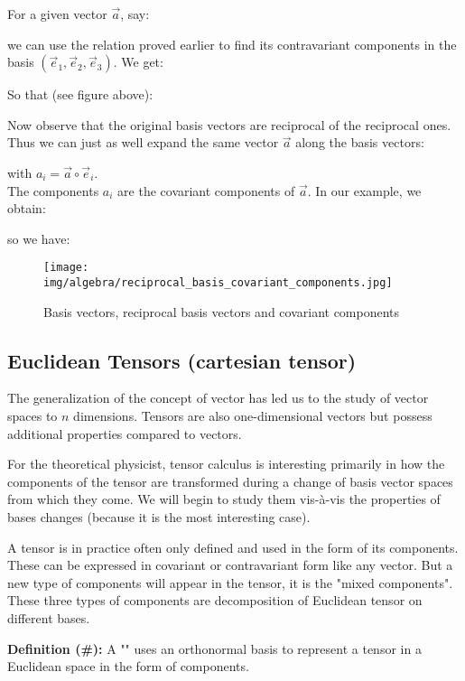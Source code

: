 	\begin{tcolorbox}[colframe=black,colback=white,sharp corners]
	For a given vector $\vec{a}$, say:
	
	we can use the relation proved earlier to find its contravariant components in the basis $(\vec{e}_1,\vec{e}_2,\vec{e}_3)$. We get:
	
	So that (see figure above):
	
	Now observe that the original basis vectors are reciprocal of the reciprocal ones. Thus we can just as well expand the same vector $\vec{a}$ along the basis vectors:
	
	with $a_i=\vec{a}\circ\vec{e}_i$.\\

	The components $a_i$ are the covariant components of $\vec{a}$. In our example, we obtain:
	
	so we have:
	
	\begin{figure}[H]
		\centering
		\texttt{[image: img/algebra/reciprocal\_basis\_covariant\_components.jpg]}
		\caption[]{Basis vectors, reciprocal basis vectors and covariant components}
	\end{figure}
	\end{tcolorbox}
	
	\subsection{Euclidean Tensors (cartesian tensor)}
	The generalization of the concept of vector has led us to the study of vector spaces to $n$ dimensions. Tensors are also one-dimensional vectors but possess additional properties compared to vectors.

	For the theoretical physicist, tensor calculus is interesting primarily in how the components of the tensor are transformed during a change of basis vector spaces from which they come. We will begin to study them vis-à-vis the properties of bases changes (because it is the most interesting case).

	A tensor is in practice often only defined and used in the form of its components. These can be expressed in covariant or contravariant form like any vector. But a new type of components will appear in the tensor, it is the "mixed components". These three types of components are decomposition of Euclidean tensor on different bases.
	
	\textbf{Definition (\#\mydef):} A "" uses an orthonormal basis to represent a tensor in a Euclidean space in the form of components.

